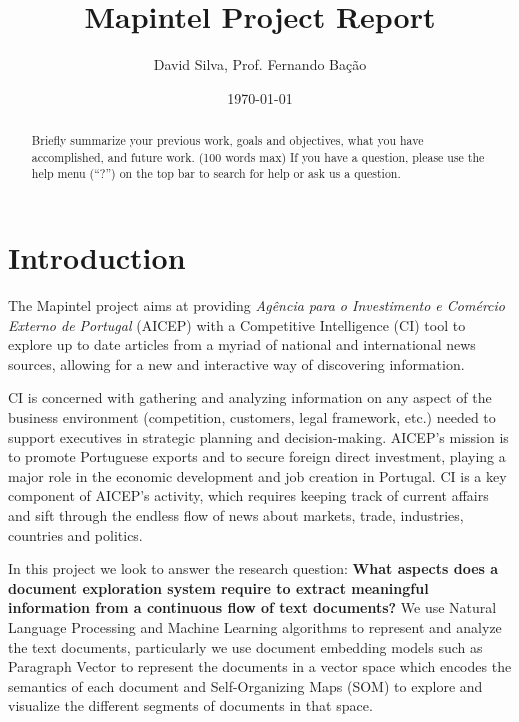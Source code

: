 \documentclass[a4paper]{article}
\title{Mapintel Project Report}
\author{David Silva, Prof. Fernando Bação}
\date{\today}
\begin{document}
\maketitle

\begin{abstract}
	Briefly summarize your previous work, goals and objectives, what you have accomplished, and future work. (100 words max) If you have a question, please use the help menu (``?'') on the top bar to search for help or ask us a question.
\end{abstract}
\section*{Introduction}
The Mapintel project aims at providing \textit{Agência para o Investimento e Comércio Externo de Portugal} (AICEP) with a Competitive Intelligence (CI) tool to explore up to date articles from a myriad of national and international news sources, allowing for a new and interactive way of discovering information. 

CI is concerned with gathering and analyzing information on any aspect of the business environment (competition, customers, legal framework, etc.) needed to support executives in strategic planning and decision-making. AICEP’s mission is to promote Portuguese exports and to secure foreign direct investment, playing a major role in the economic development and job creation in Portugal. CI is a key component of AICEP’s activity, which requires keeping track of current affairs and sift through the endless flow of news about markets, trade, industries, countries and politics.

In this project we look to answer the research question: \textbf{What aspects does a document exploration system require to extract meaningful information from a continuous flow of text documents?} We use Natural Language Processing and Machine Learning algorithms to represent and analyze the text documents, particularly we use document embedding models such as Paragraph Vector \citep{Le2014} to represent the documents in a vector space which encodes the semantics of each document and Self-Organizing Maps (SOM) \citep{Kohonen1982} to explore and visualize the different segments of documents in that space.
\end{document}
